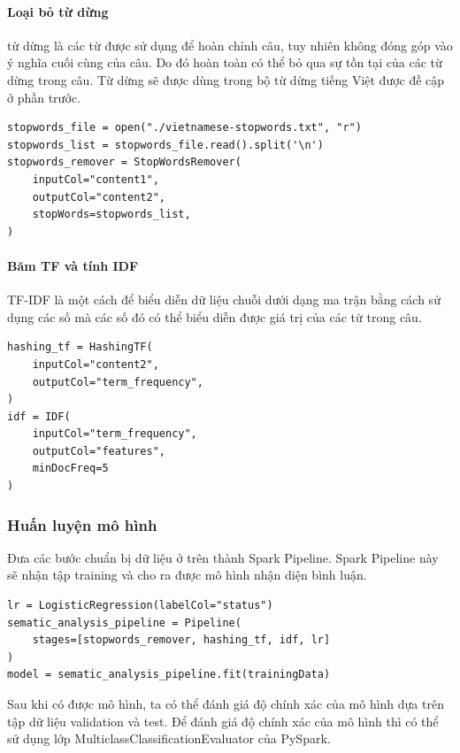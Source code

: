 \documentclass[runningheads]{llncs}
\begin{document}
\paragraph{Loại bỏ từ dừng} từ dừng là các từ được sử dụng để hoàn chỉnh câu, tuy nhiên không đóng góp vào ý nghĩa cuối cùng của câu. Do đó hoàn toàn có thể bỏ qua sự tồn tại của các từ dừng trong câu. Từ dừng sẽ được dùng trong bộ từ dừng tiếng Việt được đề cập ở phần trước.

\begin{lstlisting}
stopwords_file = open("./vietnamese-stopwords.txt", "r")
stopwords_list = stopwords_file.read().split('\n')
stopwords_remover = StopWordsRemover(
    inputCol="content1",
    outputCol="content2",
    stopWords=stopwords_list,
)
\end{lstlisting}

\paragraph{Băm TF và tính IDF} TF-IDF là một cách để biểu diễn dữ liệu chuỗi dưới dạng ma trận bằng cách sử dụng các số mà các số đó có thể biểu diễn được giá trị của các từ trong câu.

\begin{lstlisting}
hashing_tf = HashingTF(
    inputCol="content2",
    outputCol="term_frequency",
)
idf = IDF(
    inputCol="term_frequency",
    outputCol="features",
    minDocFreq=5
)
\end{lstlisting}

\subsubsection{Huấn luyện mô hình}

Đưa các bước chuẩn bị dữ liệu ở trên thành Spark Pipeline. Spark Pipeline này sẽ nhận tập training và cho ra được mô hình nhận diện bình luận.

\begin{lstlisting}
lr = LogisticRegression(labelCol="status")
sematic_analysis_pipeline = Pipeline(
    stages=[stopwords_remover, hashing_tf, idf, lr]
)
model = sematic_analysis_pipeline.fit(trainingData)
\end{lstlisting}

Sau khi có được mô hình, ta có thể đánh giá độ chính xác của mô hình dựa trên tập dữ liệu validation và test. Để đánh giá độ chính xác của mô hình thì có thể sử dụng lớp MulticlassClassificationEvaluator của PySpark. 
\end{document}
